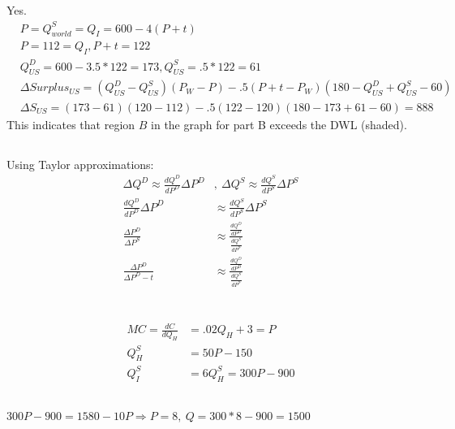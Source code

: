 \documentclass{article}
\begin{document}
	\subsection[h]{}
		Yes. 
		\begin{align*}
			&P = Q^S_{world} = Q_I =600-4(P+t)\\
			&P = 112 = Q_I, P+t=122\\
			&Q^D_{US} = 600-3.5*122 = 173 , Q^S_{US} = .5*122 = 61\\
			&\Delta Surplus_{US} = (Q^D_{US}-Q^S_{US})(P_W-P)-.5(P+t-P_W)(180-Q^D_{US}+Q^S_{US}-60)\\
			&\Delta S_{US} = (173-61)(120-112)-.5(122-120)(180-173+61-60) = 888
		\end{align*}
		This indicates that region $B$ in the graph for part B exceeds the DWL (shaded). 
	\subsection[i]{}
		Using Taylor approximations:
		\setcounter{equation}{0}
		\begin{align}
			\Delta Q^D \approx \frac{dQ^D}{dP^D}\Delta P^D &, ~ \Delta Q^S \approx \frac{dQ^S}{dP^S}\Delta P^S \\
			\frac{dQ^D}{dP^D}\Delta P^D & \approx \frac{dQ^S}{dP^S}\Delta P^S \\
			\frac{\Delta P^D}{\Delta P^S} & \approx \frac{\frac{dQ^D}{dP^D}}{\frac{dQ^S}{dP^S}} \\
			\frac{\Delta P^D}{\Delta P^D - t} & \approx \frac{\frac{dQ^D}{dP^D}}{\frac{dQ^S}{dP^S}}
		\end{align}		
\section[4]{}
	\subsection[a]{}
		\begin{align*}
			MC = \frac{dC}{dQ_H} &= .02Q_H + 3 = P\\
			Q^S_H &= 50P-150 \\
			Q^S_I &= 6Q^S_H = 300P-900
		\end{align*}
	\subsection[b]{}	
		$300P-900=1580-10P \Rightarrow P = 8,~ Q=300*8-900=1500$
\end{document}
